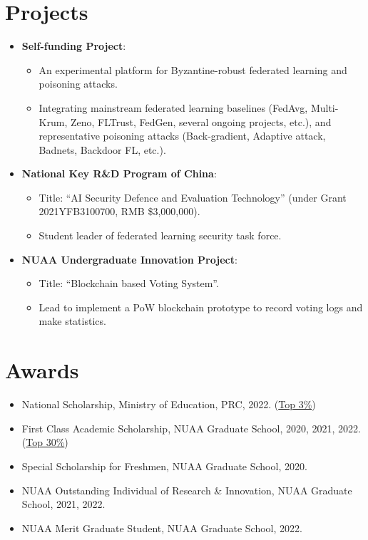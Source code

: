 \documentclass[letterpaper,11pt]{article}
\newcommand{\resumeItem}[2]{
  \item\small{
    \textbf{#1}{: #2 \vspace{-2pt}}
  }
}
\newcommand{\resumeSubItem}[2]{\resumeItem{#1}{#2}\vspace{-4pt}}
\newcommand{\resumeSubHeadingListStart}{\begin{itemize}[leftmargin=*]}
\newcommand{\resumeSubHeadingListEnd}{\end{itemize}}
\begin{document}
\section{Projects}
  \resumeSubHeadingListStart
    \resumeSubItem{Self-funding Project}\hfill{2020.01 -- , host, ongoing}
      {
        \begin{itemize}
          \item An experimental platform for Byzantine-robust federated learning and poisoning attacks.
          \item Integrating mainstream federated learning baselines (FedAvg, Multi-Krum, Zeno, FLTrust, FedGen, several ongoing projects, etc.), and representative poisoning attacks (Back-gradient, Adaptive attack, Badnets, Backdoor FL, etc.).
        \end{itemize}
      }
    \resumeSubItem{National Key R\&D Program of China}\hfill{2021.12 -- 2024.11, participant, ongoing}
      {
        \begin{itemize}
          \item Title: ``AI Security Defence and Evaluation Technology'' (under Grant 2021YFB3100700, RMB \$3,000,000).
          \item Student leader of federated learning security task force.
        \end{itemize}
      }
    \resumeSubItem{NUAA Undergraduate Innovation Project}\hfill{2017.12 -- 2018.05, principal participant, accomplished}
    {
        \begin{itemize}
          \item Title: ``Blockchain based Voting System''.
          \item Lead to implement a PoW blockchain prototype to record voting logs and make statistics.
        \end{itemize}
    }
  \resumeSubHeadingListEnd

%
\section{Awards}
  \resumeSubHeadingListStart
    \item{
      National Scholarship, Ministry of Education, PRC, 2022. (\textcolor[rgb]{1.00,0.00,0.00}{\underline{Top 3\%}})
    }
    \item{
       First Class Academic Scholarship, NUAA Graduate School, 2020, 2021, 2022. (\textcolor[rgb]{1.00,0.00,0.00}{\underline{Top 30\%}})
    }
    \item{
       Special Scholarship for Freshmen, NUAA Graduate School, 2020.
    }
    \item{
       NUAA Outstanding Individual of Research \& Innovation, NUAA Graduate School, 2021, 2022.
    }
    \item{
       NUAA Merit Graduate Student, NUAA Graduate School, 2022.
    }
  \resumeSubHeadingListEnd


\end{document}
